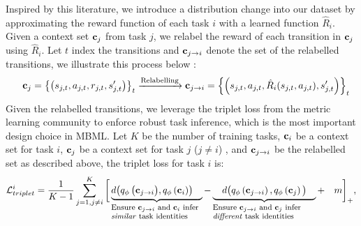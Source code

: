 Inspired by this literature, we introduce a distribution change into our dataset by approximating the reward function of each task $i$ with a learned function $\hat{R}_i$. Given a context set ${\bf c}_j$ from task $j$, we relabel the reward of each transition in ${\bf c}_j$ using $\hat{R}_i$. Let $t$ index the transitions and ${\bf c}_{j\rightarrow{i}}$ denote the set of the relabelled transitions, we illustrate this process below :
\begin{equation}\label{eq_relabel}
    \quad {\bf c}_{j}=\left\{ \left(s_{j, t}, a_{j, t}, r_{j, t}, s_{j, t}^{\prime}\right) \right\}_t   \xrightarrow{\text{Relabelling}} {\bf c}_{j\rightarrow{i}} = \left\{ \left(s_{j, t}, a_{j, t}, \hat{R}_i(s_{j, t}, a_{j, t}), s_{j, t}^{\prime} \right) \right\}_t
\end{equation}
Given the relabelled transitions, we leverage the triplet loss from the metric learning community \cite{hermans2017defense} to enforce robust task inference, which is the most important design choice in MBML. Let $K$ be the number of training tasks, ${\bf c}_i$ be a context set for task $i$, ${\bf c}_j$ be
a context set for task $j$ ($j \neq i$)
, and ${\bf c}_{j\rightarrow{i}}$ be the relabelled set as described above, the triplet loss for task $i$ is:
\begin{equation}\label{eq_triplet_task_i}
    \mathcal{L}^i_{triplet} = \frac{1}{K-1} \sum_{j=1, j \neq i }^{K} \bigg[\explain{d \big(q_{\phi}\left({\bf c}_{j\rightarrow{i}}\big), q_{\phi}\left({\bf c}_{i}\right)\right) \quad}{Ensure ${\bf c}_{j\rightarrow{i}}$ and ${\bf c}_{i}$ infer \textit{similar} task identities \quad}
        - \explain{ \quad d\big(q_{\phi}\left({\bf c}_{j\rightarrow{i}}\right), q_{\phi}\left({\bf c}_{j}\right)\big) \quad}{Ensure ${\bf c}_{j\rightarrow{i}}$ and ${\bf c}_{j}$ infer \textit{different} task identities} + \quad m\bigg]_{+},
\end{equation}

